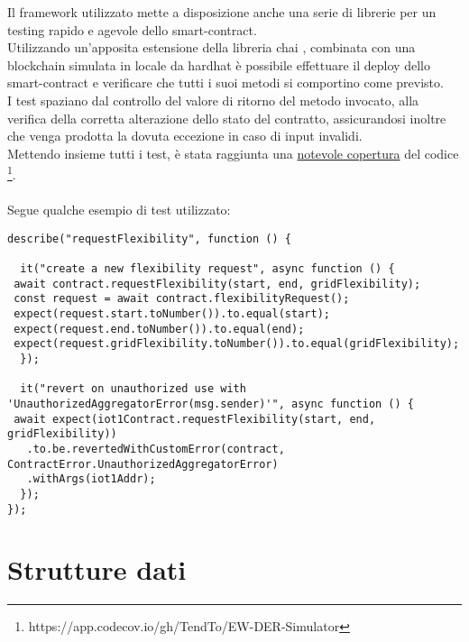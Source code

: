 Il framework utilizzato mette a disposizione anche una serie di librerie per un testing rapido e agevole dello \gls{smart-contract}. \\
Utilizzando un'apposita estensione della libreria chai \cite{sftw:chai}, combinata con una blockchain simulata in locale da hardhat
è possibile effettuare il deploy dello \gls{smart-contract} e verificare che tutti i suoi metodi si comportino come previsto. \\
I test spaziano dal controllo del valore di ritorno del metodo invocato, alla verifica della corretta alterazione dello stato del contratto,
assicurandosi inoltre che venga prodotta la dovuta eccezione in caso di input invalidi. \\
Mettendo insieme tutti i test, è stata raggiunta una \href{https://app.codecov.io/gh/TendTo/EW-DER-Simulator}{notevole copertura} del codice \footnote{https://app.codecov.io/gh/TendTo/EW-DER-Simulator}. \\
\\
Segue qualche esempio di test utilizzato:
\begin{verbatim}
describe("requestFlexibility", function () {

  it("create a new flexibility request", async function () {
 await contract.requestFlexibility(start, end, gridFlexibility);
 const request = await contract.flexibilityRequest();
 expect(request.start.toNumber()).to.equal(start);
 expect(request.end.toNumber()).to.equal(end);
 expect(request.gridFlexibility.toNumber()).to.equal(gridFlexibility);
  });

  it("revert on unauthorized use with 'UnauthorizedAggregatorError(msg.sender)'", async function () {
 await expect(iot1Contract.requestFlexibility(start, end, gridFlexibility))
   .to.be.revertedWithCustomError(contract, ContractError.UnauthorizedAggregatorError)
   .withArgs(iot1Addr);
  });
});
\end{verbatim}

\section{Strutture dati}

